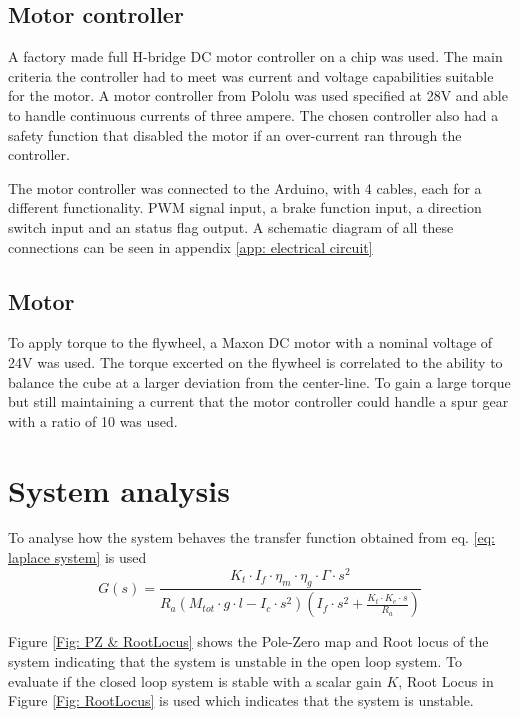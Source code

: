 \documentclass[a4paper,11pt]{kth-mag}
\begin{document}
\subsection{Motor controller}
A factory made full H-bridge DC motor controller on a chip was used. The main criteria the controller had to meet was current and voltage capabilities suitable for the motor. A motor controller from Pololu was used specified at 28V and able to handle continuous currents of three ampere. The chosen controller also had a safety function that disabled the motor if an over-current ran through the controller.

The motor controller was connected to the Arduino, with 4 cables, each for a different functionality. PWM signal input, a brake function input, a direction switch input and an status flag output. A schematic diagram of all these connections can be seen in appendix \ref{app: electrical circuit}

\subsection{Motor}
To apply torque to the flywheel, a Maxon DC motor with a nominal voltage of 24V was used. The torque excerted on the flywheel is correlated to the ability to balance the cube at a larger deviation from the center-line. To gain a large torque but still maintaining a current that the motor controller could handle a spur gear with a ratio of 10 was used. 

\section{System analysis}
To analyse how the system behaves the transfer function obtained from eq. \ref{eq: laplace system} is used
\begin{equation}\label{eq: transfer function final}
G(s) = \frac{K_t \cdot I_f \cdot \eta_m \cdot \eta_g \cdot \Gamma \cdot s^2}{R_a (M_{tot} \cdot g \cdot l - I_c \cdot s^2)(I_f \cdot s^2 + \frac{K_t \cdot K_e \cdot s}{R_a})} 
\end{equation}

Figure \ref{Fig: PZ & RootLocus} shows the Pole-Zero map and Root locus of the system indicating that the system is unstable in the open loop system. \cite{regler} To evaluate if the closed loop system is stable with a scalar gain $K$, Root Locus in Figure \ref{Fig: RootLocus} is used which indicates that the system is unstable.
\end{document}
